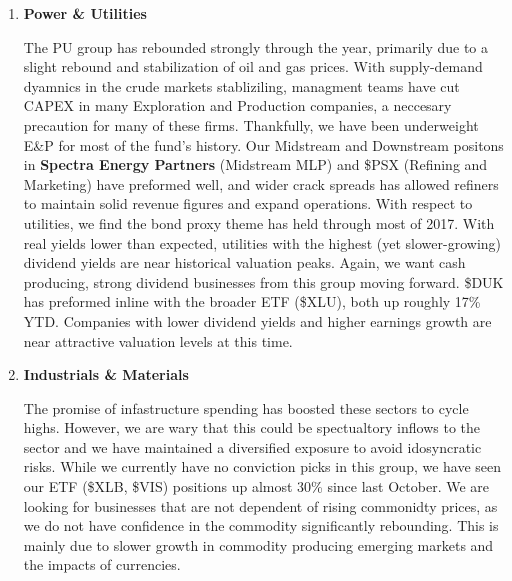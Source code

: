 \documentclass[11pt,pressrelease]{newlfm} %
\begin{document}
\begin{newlfm}
\begin{singlespace}
\begin{enumerate}
\item \textbf{Power \& Utilities} \par
The PU group has rebounded strongly through the year, primarily due to a slight rebound and stabilization of oil and gas prices. With supply-demand dyamnics in the crude markets stabliziling, managment teams have cut CAPEX in many Exploration and Production companies, a neccesary precaution for many of these firms. Thankfully, we have been underweight E\&P for most of the fund's history. Our Midstream and Downstream positons in \textbf{Spectra Energy Partners} (Midstream MLP) and \$PSX (Refining and Marketing) have preformed well, and wider crack spreads has allowed refiners to maintain solid revenue figures and expand operations. With respect to utilities, we find the bond proxy theme has held through most of 2017. With real yields lower than expected, utilities with the highest (yet slower-growing) dividend yields are near historical valuation peaks. Again, we want cash producing, strong dividend businesses from this group moving forward. \$DUK has preformed inline with the broader ETF (\$XLU), both up roughly 17\% YTD. Companies with lower dividend yields and higher earnings growth are near attractive valuation levels at this time.

\item \textbf{Industrials \& Materials} \par
The promise of infastructure spending has boosted these sectors to cycle highs. However, we are wary that this could be spectualtory inflows to the sector and we have maintained a diversified exposure to avoid idosyncratic risks. While we currently have no conviction picks in this group, we have seen our ETF (\$XLB, \$VIS) positions up almost 30\% since last October. We are looking for businesses that are not dependent of rising commonidty prices, as we do not have confidence in the commodity significantly rebounding. This is mainly due to slower growth in commodity producing emerging markets and the impacts of currencies.


\end{enumerate}
\end{singlespace}
\end{newlfm}
\end{document}
